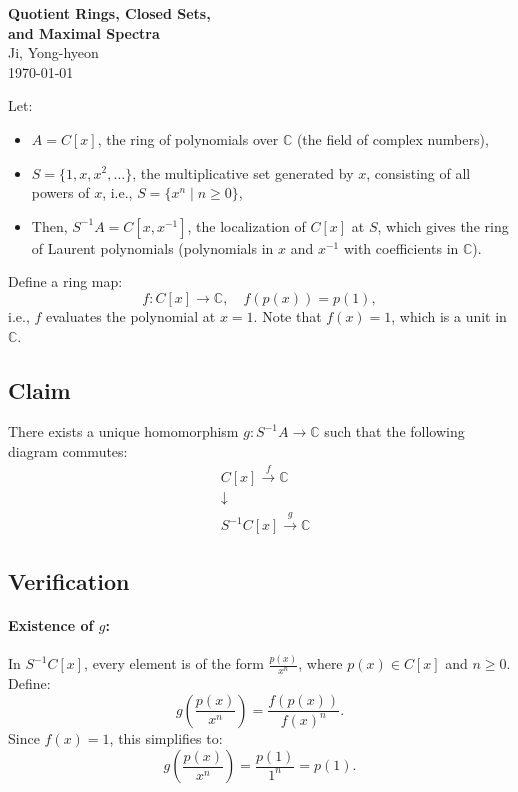 \documentclass[11pt,openany]{article}
\begin{document}
\begin{center}
	\huge\textbf{Quotient Rings, Closed Sets,\\ and Maximal Spectra}\\
	\vspace{0.5em}
	\large{Ji, Yong-hyeon}\\
	\vspace{0.5em}
	\normalsize{\today}\\
\end{center}

Let:
\begin{itemize}
	\item \( A = C[x] \), the ring of polynomials over \( \mathbb{C} \) (the field of complex numbers),
	\item \( S = \{1, x, x^2, \dots\} \), the multiplicative set generated by \( x \), consisting of all powers of \( x \), i.e., \( S = \{x^n \mid n \geq 0\} \),
	\item Then, \( S^{-1}A = C[x, x^{-1}] \), the localization of \( C[x] \) at \( S \), which gives the ring of Laurent polynomials (polynomials in \( x \) and \( x^{-1} \) with coefficients in \( \mathbb{C} \)).
\end{itemize}

Define a ring map:
\[
f: C[x] \to \mathbb{C}, \quad f(p(x)) = p(1),
\]
i.e., \( f \) evaluates the polynomial at \( x = 1 \). Note that \( f(x) = 1 \), which is a unit in \( \mathbb{C} \).

\subsection*{Claim}
There exists a unique homomorphism \( g : S^{-1}A \to \mathbb{C} \) such that the following diagram commutes:
\[
\begin{aligned}
	& C[x] \xrightarrow{f} \mathbb{C} \\
	& \downarrow \\
	& S^{-1}C[x] \xrightarrow{g} \mathbb{C}
\end{aligned}
\]

\subsection*{Verification}

\paragraph{Existence of \( g \):} In \( S^{-1}C[x] \), every element is of the form \( \frac{p(x)}{x^n} \), where \( p(x) \in C[x] \) and \( n \geq 0 \). Define:
\[
g\left(\frac{p(x)}{x^n}\right) = \frac{f(p(x))}{f(x)^n}.
\]
Since \( f(x) = 1 \), this simplifies to:
\[
g\left(\frac{p(x)}{x^n}\right) = \frac{p(1)}{1^n} = p(1).
\]
\end{document}
